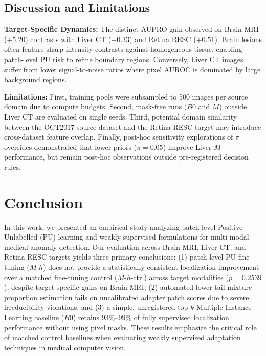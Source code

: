 \documentclass[10pt,twocolumn,letterpaper]{article}
\begin{document}
\subsection{Discussion and Limitations}
\noindent\textbf{Target-Specific Dynamics:} The distinct AUPRO gain observed on Brain MRI ($+5.20$) contrasts with Liver CT ($+0.33$) and Retina RESC ($+0.51$). Brain lesions often feature sharp intensity contrasts against homogeneous tissue, enabling patch-level PU risk to refine boundary regions. Conversely, Liver CT images suffer from lower signal-to-noise ratios where pixel AUROC is dominated by large background regions.

\noindent\textbf{Limitations:} First, training pools were subsampled to 500 images per source domain due to compute budgets. Second, mask-free runs ($B0$ and $M$) outside Liver CT are evaluated on single seeds. Third, potential domain similarity between the OCT2017 source dataset and the Retina RESC target may introduce cross-dataset feature overlap. Finally, post-hoc sensitivity explorations of $\pi$ overrides demonstrated that lower priors ($\pi = 0.05$) improve Liver $M$ performance, but remain post-hoc observations outside pre-registered decision rules.

\section{Conclusion}
\label{sec:conclusion}

In this work, we presented an empirical study analyzing patch-level Positive-Unlabelled (PU) learning and weakly supervised formulations for multi-modal medical anomaly detection. Our evaluation across Brain MRI, Liver CT, and Retina RESC targets yields three primary conclusions: (1) patch-level PU fine-tuning ($M\text{-}h$) does not provide a statistically consistent localization improvement over a matched fine-tuning control ($M\text{-}h\text{-ctrl}$) across target modalities ($p = 0.2539$), despite target-specific gains on Brain MRI; (2) automated lower-tail mixture-proportion estimation fails on uncalibrated adapter patch scores due to severe irreducibility violations; and (3) a simple, unregistered top-$k$ Multiple Instance Learning baseline ($B0$) retains $93\%\text{--}99\%$ of fully supervised localization performance without using pixel masks. These results emphasize the critical role of matched control baselines when evaluating weakly supervised adaptation techniques in medical computer vision.

\clearpage
{\small


}
\end{document}
